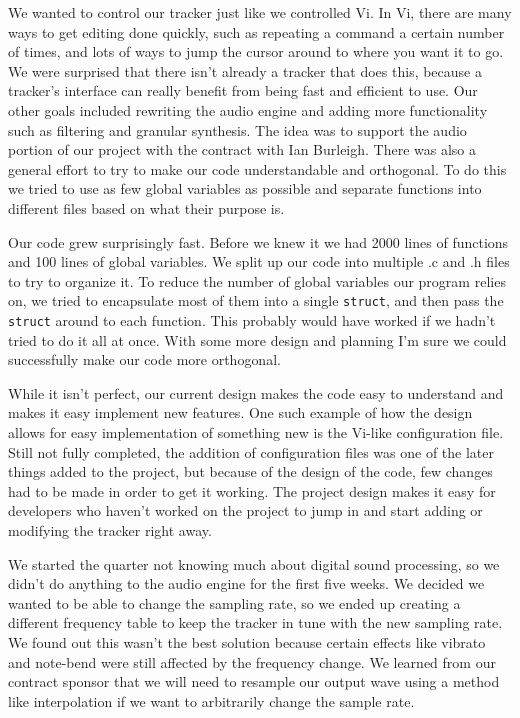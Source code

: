 \documentclass[12pt,letterpaper]{article}
\begin{document}
\par
We wanted to control our tracker just like we controlled Vi.
In Vi, there are many ways to get editing done quickly, such as repeating a command a certain number of times, and lots of ways to jump the cursor around to where you want it to go.
We were surprised that there isn't already a tracker that does this, because a tracker's interface can really benefit from being fast and efficient to use.
Our other goals included rewriting the audio engine and adding more functionality such as filtering and granular synthesis.
The idea was to support the audio portion of our project with the contract with Ian Burleigh.
There was also a general effort to try to make our code understandable and orthogonal.
To do this we tried to use as few global variables as possible and separate functions into different files based on what their purpose is.

\par
Our code grew surprisingly fast.
Before we knew it we had 2000 lines of functions and 100 lines of global variables.
We split up our code into multiple .c and .h files to try to organize it.
To reduce the number of global variables our program relies on, we tried to encapsulate most of them into a single {\tt struct}, and then pass the {\tt struct} around to each function.
This probably would have worked if we hadn't tried to do it all at once.
With some more design and planning I'm sure we could successfully make our code more orthogonal.

\par
While it isn't perfect, our current design makes the code easy to understand and makes it easy implement new features.
One such example of how the design allows for easy implementation of something new is the Vi-like configuration file. 
Still not fully completed, the addition of configuration files was one of the later things added to the project, but because of the design of the code, few changes had to be made in order to get it working.
The project design makes it easy for developers who haven't worked on the project to jump in and start adding or modifying the tracker right away.

\par
We started the quarter not knowing much about digital sound processing, so we didn't do anything to the audio engine for the first five weeks.
We decided we wanted to be able to change the sampling rate, so we ended up creating a different frequency table to keep the tracker in tune with the new sampling rate.
We found out this wasn't the best solution because certain effects like vibrato and note-bend were still affected by the frequency change.
We learned from our contract sponsor that we will need to resample our output wave using a method like interpolation if we want to arbitrarily change the sample rate.
\end{document}
